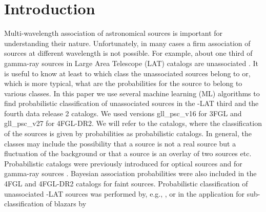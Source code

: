 \section{Introduction}

Multi-wavelength association of astronomical sources is important for understanding their nature.
Unfortunately, in many cases a firm association of sources at different wavelength is not possible.
For example, about one third of gamma-ray sources in \Fermi Large Area Telescope (LAT) catalogs are unassociated
\citep{2010ApJS..188..405A, 2012ApJS..199...31N, 2015ApJS..218...23A, 2020ApJS..247...33A}.
It is useful to know at least to which class the unassociated sources belong to or, which is more typical,
what are the probabilities for the source to belong to various classes.
In this paper we use several machine learning (ML) algorithms to find probabilistic classification of
unassociated sources in the \Fermi-LAT third \citep[3FGL,][]{2015ApJS..218...23A} and the fourth data release 2
\citep[4FGL-DR2,][]{2020ApJS..247...33A, 2020arXiv200511208B} catalogs. We used  versions gll\_psc\_v16 for 3FGL
and  gll\_psc\_v27 for 4FGL-DR2.
We will refer to the catalogs, where the classification of the sources is given by probabilities as probabilistic catalogs.
In general, the classes may include the possibility that a source is not a real source but a fluctuation of the background 
or that a source is an overlay of two sources etc.
Probabilistic catalogs
were previously introduced for optical sources 
\citep[e.g.,][]{2010EAS....45..351H, 2013AJ....146....7B}
and for gamma-ray sources \citep{2017ApJ...839....4D}.
Bayesian association probabilities were also included in the 4FGL \citep{2020ApJS..247...33A} and
4FGL-DR2 \citep{2020arXiv200511208B} catalogs for faint sources.
Probabilistic classification of unassociated \Fermi-LAT sources was performed by, e.g.,
\cite{2012ApJ...753...83A, 2016ApJ...820....8S, 2016ApJ...825...69M, 2017A&A...602A..86L, 2020MNRAS.492.5377L, 2020arXiv200106010Z},
or in the application for sub-classification of blazars by
\cite{2013MNRAS.428..220H, 2014ApJ...782...41D, 2016MNRAS.462.3180C, 2017MNRAS.470.1291S, 2019MNRAS.490.4770K, 2020MNRAS.493.1926K}

